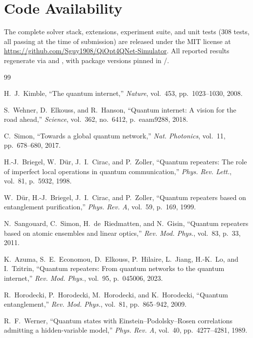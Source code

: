 \documentclass[twocolumn]{article}
\begin{document}
\section*{Code Availability}
The complete solver stack, extensions, experiment suite, and unit
tests (308 tests, all passing at the time of submission) are released
under the MIT license at
\url{https://github.com/Sguy1908/QiOpt4QNet-Simulator}.  All reported
results regenerate via  and
, with package versions pinned
in /.


\begin{thebibliography}{99}

H.~J.~Kimble, ``The quantum internet,''
\emph{Nature}, vol.~453, pp.~1023--1030, 2008.

S.~Wehner, D.~Elkouss, and R.~Hanson,
``Quantum internet: A vision for the road ahead,''
\emph{Science}, vol.~362, no.~6412, p.~eaam9288, 2018.

C.~Simon, ``Towards a global quantum network,''
\emph{Nat. Photonics}, vol.~11, pp.~678--680, 2017.

H.-J.~Briegel, W.~D\"ur, J.~I.~Cirac, and P.~Zoller,
``Quantum repeaters: The role of imperfect local operations in quantum
communication,''
\emph{Phys. Rev. Lett.}, vol.~81, p.~5932, 1998.

W.~D\"ur, H.-J.~Briegel, J.~I.~Cirac, and P.~Zoller,
``Quantum repeaters based on entanglement purification,''
\emph{Phys. Rev. A}, vol.~59, p.~169, 1999.

N.~Sangouard, C.~Simon, H.~de~Riedmatten, and N.~Gisin,
``Quantum repeaters based on atomic ensembles and linear optics,''
\emph{Rev. Mod. Phys.}, vol.~83, p.~33, 2011.

K.~Azuma, S.~E.~Economou, D.~Elkouss, P.~Hilaire, L.~Jiang,
H.-K.~Lo, and I.~Tzitrin,
``Quantum repeaters: From quantum networks to the quantum internet,''
\emph{Rev. Mod. Phys.}, vol.~95, p.~045006, 2023.

R.~Horodecki, P.~Horodecki, M.~Horodecki, and K.~Horodecki,
``Quantum entanglement,''
\emph{Rev. Mod. Phys.}, vol.~81, pp.~865--942, 2009.

R.~F.~Werner, ``Quantum states with Einstein--Podolsky--Rosen
correlations admitting a hidden-variable model,''
\emph{Phys. Rev. A}, vol.~40, pp.~4277--4281, 1989.


\end{thebibliography}
\end{document}
